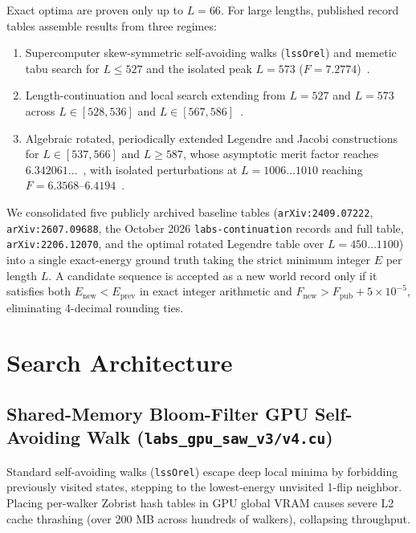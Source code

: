\documentclass[10.5pt,letterpaper]{article}
\begin{document}
Exact optima are proven only up to $L = 66$. For large lengths, published record tables assemble results from three regimes:
\begin{enumerate}
\item Supercomputer skew-symmetric self-avoiding walks (\texttt{lssOrel}) and memetic tabu search for $L \le 527$ and the isolated peak $L = 573$ ($F = 7.2774$)~\cite{boskovic2024,vega2026}.
\item Length-continuation and local search extending from $L = 527$ and $L = 573$ across $L \in [528, 536]$ and $L \in [567, 586]$~\cite{labs_cont2026}.
\item Algebraic rotated, periodically extended Legendre and Jacobi constructions for $L \in [537, 566]$ and $L \ge 587$, whose asymptotic merit factor reaches $6.342061\dots$~\cite{jedwab2013}, with isolated perturbations at $L = 1006\dots 1010$ reaching $F = 6.3568$--$6.4194$~\cite{jacobi2022}.
\end{enumerate}

We consolidated five publicly archived baseline tables (\texttt{arXiv:2409.07222}, \texttt{arXiv:2607.09688}, the October 2026 \texttt{labs-continuation} records and full table, \texttt{arXiv:2206.12070}, and the optimal rotated Legendre table over $L = 450\dots 1100$) into a single exact-energy ground truth taking the strict minimum integer $E$ per length $L$. A candidate sequence is accepted as a new world record only if it satisfies both $E_{\text{new}} < E_{\text{prev}}$ in exact integer arithmetic and $F_{\text{new}} > F_{\text{pub}} + 5 \times 10^{-5}$, eliminating 4-decimal rounding ties.

\section{Search Architecture}

\subsection{Shared-Memory Bloom-Filter GPU Self-Avoiding Walk (\texttt{labs\_gpu\_saw\_v3/v4.cu})}

Standard self-avoiding walks (\texttt{lssOrel}) escape deep local minima by forbidding previously visited states, stepping to the lowest-energy unvisited 1-flip neighbor. Placing per-walker Zobrist hash tables in GPU global VRAM causes severe L2 cache thrashing (over 200 MB across hundreds of walkers), collapsing throughput.
\end{document}
